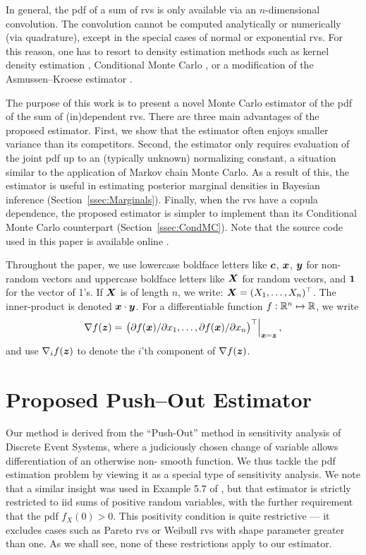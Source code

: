 In general, the pdf of a sum of rvs is only available via an $n$-dimensional convolution.
The convolution  cannot be computed  analytically  or numerically (via quadrature), except in the special cases of normal or exponential rvs. For this reason, one has to resort to density estimation methods such as kernel density estimation \cite{botev2010kernel}, Conditional Monte Carlo \cite{asmussen2017conditional}, or a modification of the Asmussen--Kroese estimator \cite{Asmussen2006}. 


The purpose of this work is to  present a novel Monte Carlo estimator of the pdf of the sum of (in)dependent  rvs. There are three main  advantages of the proposed estimator. First,
we show that the estimator often enjoys smaller variance than its competitors.
Second,  the estimator only requires  evaluation of   the joint pdf up 
to an (typically unknown) normalizing constant, a situation similar to the application of Markov chain Monte Carlo. As a result of this, the estimator is useful in estimating posterior marginal densities in Bayesian inference (Section~\ref{ssec:Marginals}).  Finally, when the rvs have a copula dependence, the proposed estimator is simpler to implement than its Conditional Monte Carlo counterpart (Section~\ref{ssec:CondMC}). 
Note that the source code used in this paper is available online \cite{Code}.




Throughout the paper, we use lowercase boldface letters like $\boldsymbol{c}$, $\boldsymbol{x}$, $\boldsymbol{y}$ for non-random vectors and uppercase boldface letters like $\boldsymbol{X}$ for random vectors, and $\boldsymbol{1}$ for the vector of 1's. If $\boldsymbol{X}$ is of length $n$, we write:  $\boldsymbol{X}=(X_1, \dots, X_n)^\top$. The inner-product is denoted  $\boldsymbol{x} \cdot \boldsymbol{y}$. For a differentiable  function $f: \mathbb{R}^n\mapsto \mathbb{R}$, we write
\[ \nabla f(\boldsymbol{z}) = \left. \left( \partial f(\boldsymbol{x}) / \partial x_1 , \dots, \partial f(\boldsymbol{x}) / \partial x_n \right)^\top \right\vert_{\boldsymbol{x} = \boldsymbol{z}}, \] 
and use $\nabla_i f(\boldsymbol{z})$ to denote the $i$'th component of $\nabla f(\boldsymbol{z})$. 


\section{Proposed Push--Out Estimator} \label{sec:GeneralSetup}
Our method is derived from the ``Push-Out'' method \cite{RubinsteinReuven1992Saod,kroese2007solutions} in  sensitivity analysis of Discrete Event Systems, where a judiciously chosen change of variable  allows differentiation of an otherwise non-
smooth function. We thus tackle the pdf estimation problem by 
viewing it as a special type of  sensitivity analysis. We note 
that a similar insight was used in  Example 5.7 of \cite{
asmussen2007stochastic}, but that estimator is strictly 
restricted to iid sums of positive random variables, with the 
further requirement that the pdf $f_X(0) > 0$. This positivity 
condition is quite restrictive ---  it excludes cases such as 
Pareto rvs or  Weibull rvs with shape parameter greater than 
one. As we shall see, none of these restrictions apply to our  
estimator.




